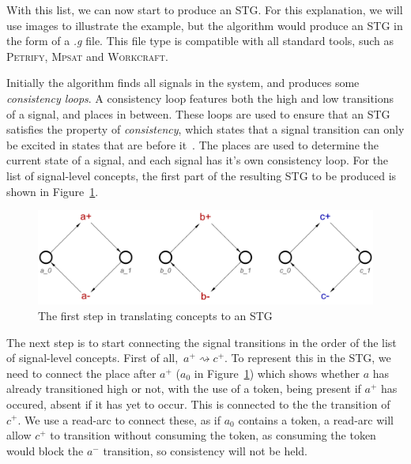 \documentclass[british,compsoc]{IEEEtran}
\newcommand{\noun}[1]{\textsc{#1}}
\begin{document}
With this list, we can now start to produce an STG. For this explanation, we will use images to illustrate the example, but the algorithm would produce an STG in the form of a \emph{.g}
file. This file type is compatible with all standard tools, such as \noun{Petrify}, \noun{Mpsat} and \noun{Workcraft}.

Initially the algorithm finds all signals in the system, and produces some \emph{consistency loops}. A consistency loop features both the high and low transitions of a signal, and places
in between. These loops are used to ensure that an STG satisfies the property of \emph{consistency}, which states that a signal transition can only be excited in states that are before
it~\cite{Cortadella}. The places are used to determine the current state of a signal, and each signal has it's own consistency loop. For the list of signal-level concepts, the first
part of the resulting STG to be produced is shown in Figure~\ref{fig:step-by-step1}.

\begin{figure}[h]
\begin{centering}
\includegraphics[scale=0.23]{Images/Step-by-step1}
\par\end{centering}

\begin{centering}
\protect\caption{\label{fig:step-by-step1}The first step in translating concepts to an STG}

\par\end{centering}

\end{figure}

The next step is to start connecting the signal transitions in the order of the list of signal-level concepts. First of all, $\,a^{+}\rightsquigarrow c^{+}$. To represent this
in the STG, we need to connect the place after $a^{+}$ ($a_0$ in Figure~\ref{fig:step-by-step1}) which shows whether $a$ has already transitioned high or not, with the use of a
token, being present if $a^{+}$ has occured, absent if it has yet to occur. This is connected to the the transition of $c^{+}$. We use a read-arc to connect these, as if $a_0$ contains
a token, a read-arc will allow $c^{+}$ to transition without consuming the token, as consuming the token would block the $a^{-}$ transition, so consistency will not be held.
\end{document}
